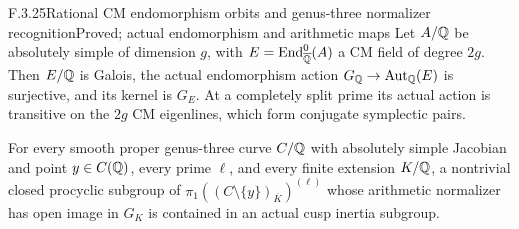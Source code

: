 \begin{result}{F.3.25}{Rational CM endomorphism orbits and genus-three normalizer recognition}{Proved; actual endomorphism and arithmetic maps}
Let $A/\mathbb Q$ be absolutely simple of dimension $g$, with
$E=\operatorname{End}^0_{\overline{\mathbb Q}}(A)$ a CM field of degree $2g$.
Then $E/\mathbb Q$ is Galois, the actual endomorphism action
$G_{\mathbb Q}\to\operatorname{Aut}_{\mathbb Q}(E)$ is surjective, and
its kernel is $G_E$. At a completely split prime its
actual action is transitive on the $2g$ CM eigenlines,
which form conjugate symplectic pairs.

For every smooth proper genus-three curve $C/\mathbb Q$ with
absolutely simple Jacobian and point $y\in C(\mathbb Q)$,
every prime $\ell$, and every finite extension $K/\mathbb Q$,
a nontrivial closed procyclic subgroup of
$\pi_1((C\setminus\{y\})_{\overline K})^{(\ell)}$
whose arithmetic normalizer has open image in $G_K$
is contained in an actual cusp inertia subgroup.
\end{result}
